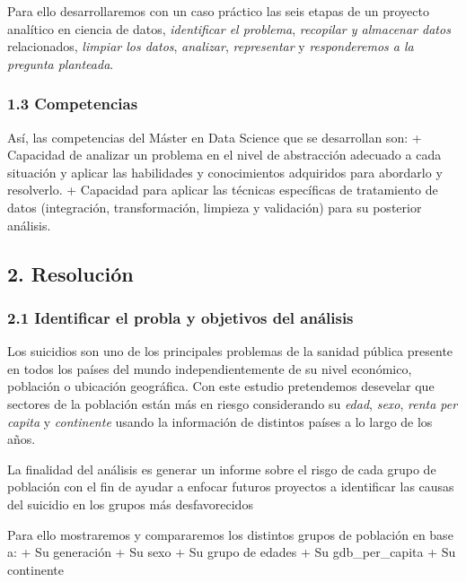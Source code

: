 \documentclass[]{article}
\begin{document}
Para ello desarrollaremos con un caso práctico las seis etapas de un
proyecto analítico en ciencia de datos, \emph{identificar el problema},
\emph{recopilar y almacenar datos} relacionados, \emph{limpiar los
datos}, \emph{analizar}, \emph{representar} y \emph{responderemos a la
pregunta planteada}.

\hypertarget{competencias}{%
\subsubsection{1.3 Competencias}\label{competencias}}

Así, las competencias del Máster en Data Science que se desarrollan son:
+ Capacidad de analizar un problema en el nivel de abstracción adecuado
a cada situación y aplicar las habilidades y conocimientos adquiridos
para abordarlo y resolverlo. + Capacidad para aplicar las técnicas
especíﬁcas de tratamiento de datos (integración, transformación,
limpieza y validación) para su posterior análisis.

\hypertarget{resolucion}{%
\subsection{2. Resolución}\label{resolucion}}

\hypertarget{identificar-el-probla-y-objetivos-del-analisis}{%
\subsubsection{2.1 Identificar el probla y objetivos del
análisis}\label{identificar-el-probla-y-objetivos-del-analisis}}

Los suicidios son uno de los principales problemas de la sanidad pública
presente en todos los países del mundo independientemente de su nivel
económico, población o ubicación geográfica. Con este estudio
pretendemos desevelar que sectores de la población están más en riesgo
considerando su \emph{edad}, \emph{sexo}, \emph{renta per capita} y
\emph{continente} usando la información de distintos países a lo largo
de los años.

La finalidad del análisis es generar un informe sobre el risgo de cada
grupo de población con el fin de ayudar a enfocar futuros proyectos a
identificar las causas del suicidio en los grupos más desfavorecidos

Para ello mostraremos y compararemos los distintos grupos de población
en base a: + Su generación + Su sexo + Su grupo de edades + Su
gdb\_per\_capita + Su continente
\end{document}
